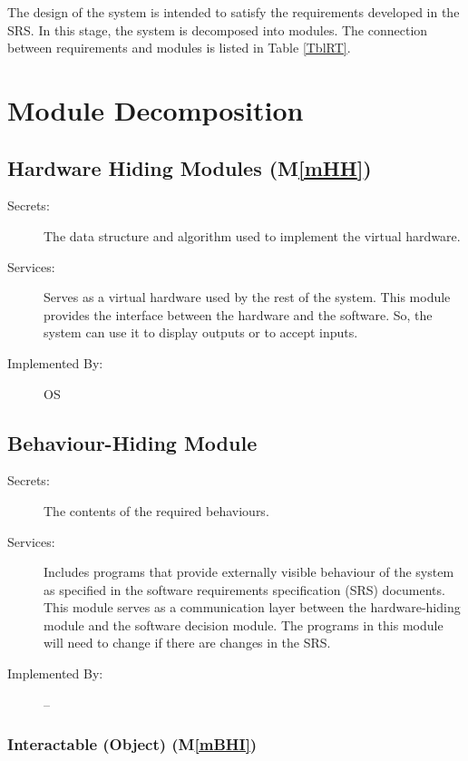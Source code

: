 \documentclass[12pt, titlepage]{article}
\newcommand{\mref}[1]{M\ref{#1}}
\begin{document}
The design of the system is intended to satisfy the requirements developed in
the SRS. In this stage, the system is decomposed into modules. The connection
between requirements and modules is listed in Table \ref{TblRT}.

\newpage

\section{Module Decomposition} \label{SecMD}

\subsection{Hardware Hiding Modules (\mref{mHH})}

\begin{description}
\item[Secrets:]The data structure and algorithm used to implement the virtual
  hardware.
\item[Services:]Serves as a virtual hardware used by the rest of the
  system. This module provides the interface between the hardware and the
  software. So, the system can use it to display outputs or to accept inputs.
\item[Implemented By:] OS
\end{description}

\subsection{Behaviour-Hiding Module}

\begin{description}
\item[Secrets:]The contents of the required behaviours.
\item[Services:]Includes programs that provide externally visible behaviour of
  the system as specified in the software requirements specification (SRS)
  documents. This module serves as a communication layer between the
  hardware-hiding module and the software decision module. The programs in this
  module will need to change if there are changes in the SRS.
\item[Implemented By:] --
\end{description}

\subsubsection{Interactable (Object) (\mref{mBHI})}
\end{document}

